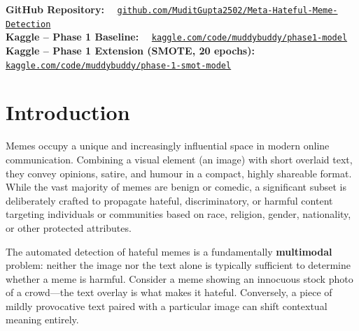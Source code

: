 \documentclass[12pt,a4paper]{article}
\begin{document}
\begin{titlepage}
  \vspace{0.5cm}

  \begin{tcolorbox}[colback=darkgray!8, colframe=darkgray!50, arc=3pt,
                    width=0.88\textwidth, boxrule=0.4pt]
    \centering
    \faGithub\quad\textbf{GitHub Repository:}~~
    \href{https://github.com/MuditGupta2502/Meta-Hateful-Meme-Detection}%
         {\textcolor{primaryblue}{\texttt{github.com/MuditGupta2502/Meta-Hateful-Meme-Detection}}}
    \\[6pt]
    \faCode\quad\textbf{Kaggle -- Phase 1 Baseline:}~~
    \href{https://www.kaggle.com/code/muddybuddy/phase1-model}%
         {\textcolor{accentorange}{\texttt{kaggle.com/code/muddybuddy/phase1-model}}}
    \\[4pt]
    \faCode\quad\textbf{Kaggle -- Phase 1 Extension (SMOTE, 20 epochs):}~~
    \href{https://www.kaggle.com/code/muddybuddy/phase-1-smot-model}%
         {\textcolor{accentorange}{\texttt{kaggle.com/code/muddybuddy/phase-1-smot-model}}}
  \end{tcolorbox}
  \vspace{0.3cm}
\end{titlepage}

\tableofcontents
\newpage

\section{Introduction}

Memes occupy a unique and increasingly influential space in modern online communication. Combining a visual element (an image) with short overlaid text, they convey opinions, satire, and humour in a compact, highly shareable format. While the vast majority of memes are benign or comedic, a significant subset is deliberately crafted to propagate hateful, discriminatory, or harmful content targeting individuals or communities based on race, religion, gender, nationality, or other protected attributes.

The automated detection of hateful memes is a fundamentally \textbf{multimodal} problem: neither the image nor the text alone is typically sufficient to determine whether a meme is harmful. Consider a meme showing an innocuous stock photo of a crowd---the text overlay is what makes it hateful. Conversely, a piece of mildly provocative text paired with a particular image can shift contextual meaning entirely.
\end{document}
